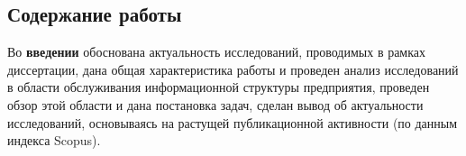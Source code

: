 \subsection*{}

\newcommand{\actuality}{\underline{\textbf{Актуальность темы.}}}
\newcommand{\aim}{{\textbf{Целью}}}
\newcommand{\tasks}{{\textbf{задачи}}}
\newcommand{\scope}{{\textbf{Область исследования}}}
\newcommand{\subject}{{\textbf{Предметом исследования}}}
\newcommand{\methods}{{\textbf{Методы исследования}}}
\newcommand{\defpositions}{{\textbf{Основные положения, выносимые на~защиту:}}}
\newcommand{\novelty}{{\textbf{Научная новизна}}}
\newcommand{\influence}{{\textbf{Практическая значимость.}}}
\newcommand{\reliability}{{\textbf{Достоверность}}}
\newcommand{\probation}{{\textbf{Апробация работы.}}}
\newcommand{\contribution}{{\textbf{Личный вклад.}}}
\newcommand{\publications}{{\textbf{Публикации.}}}




\subsection*{Содержание работы}
Во \textbf{введении} обоснована актуальность исследований, проводимых в рамках диссертации, дана общая характеристика работы и проведен анализ исследований в области обслуживания информационной структуры предприятия, проведен обзор этой области и дана постановка задач, сделан вывод об актуальности исследований, основываясь на растущей публикационной активности (по данным индекса Scopus). \par

